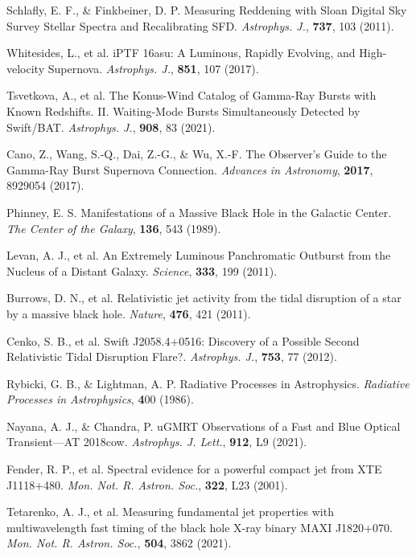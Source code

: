 \documentclass{nature_plusfigure}
\newcommand{\mn}{{Mon. Not. R. Astron. Soc.}}
\newcommand{\mnras}{\mn}
\newcommand{\apj}{{Astrophys. J.}}
\newcommand{\apjl}{{Astrophys. J. Lett.}}
\newcommand{\nat}{{Nature}}
\begin{document}
\begin{methods}
\begin{thebibliography}{10}
  Schlafly, E. F., \& Finkbeiner, D. P. Measuring Reddening with Sloan Digital Sky Survey Stellar Spectra and Recalibrating SFD. \emph{\apj}, \textbf{737}, 103 (2011). 
 
  Whitesides, L., et al. iPTF 16asu: A Luminous, Rapidly Evolving, and High-velocity Supernova. \emph{\apj}, \textbf{851}, 107 (2017). 

 

 Tsvetkova, A., et al. The Konus-Wind Catalog of Gamma-Ray Bursts with Known Redshifts. II. Waiting-Mode Bursts Simultaneously Detected by Swift/BAT. \emph{\apj}, \textbf{908}, 83 (2021). 

 Cano, Z., Wang, S.-Q., Dai, Z.-G., \& Wu, X.-F. The Observer's Guide to the Gamma-Ray Burst Supernova Connection. \emph{Advances in Astronomy}, \textbf{2017}, 8929054 (2017). 
 
 
  Phinney, E. S. Manifestations of a Massive Black Hole in the Galactic Center. \emph{The Center of the Galaxy}, \textbf{136}, 543 (1989). 
 
  Levan, A. J., et al. An Extremely Luminous Panchromatic Outburst from the Nucleus of a Distant Galaxy. \emph{Science}, \textbf{333}, 199 (2011). 

  Burrows, D. N., et al. Relativistic jet activity from the tidal disruption of a star by a massive black hole. \emph{\nat}, \textbf{476}, 421 (2011). 

 Cenko, S. B., et al. Swift J2058.4+0516: Discovery of a Possible Second Relativistic Tidal Disruption Flare?. \emph{\apj}, \textbf{753}, 77 (2012). 


 Rybicki, G. B., \& Lightman, A. P. Radiative Processes in Astrophysics. \emph{Radiative Processes in Astrophysics}, \textbf 400 (1986). 

 Nayana, A. J., \& Chandra, P. uGMRT Observations of a Fast and Blue Optical Transient—AT 2018cow. \emph{\apjl}, \textbf{912}, L9 (2021). 

 Fender, R. P., et al. Spectral evidence for a powerful compact jet from XTE J1118+480. \emph{\mnras}, \textbf{322}, L23 (2001).

 Tetarenko, A. J., et al. Measuring fundamental jet properties with multiwavelength fast timing of the black hole X-ray binary MAXI J1820+070. \emph{\mnras}, \textbf{504}, 3862 (2021).  


\end{thebibliography}
\end{methods}
\end{document}
